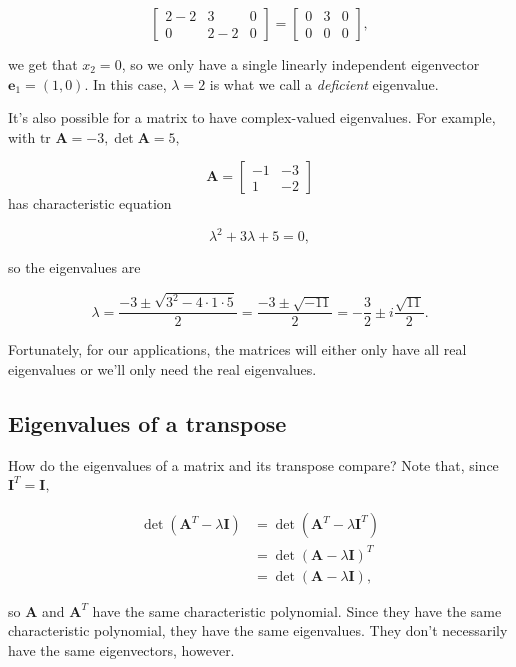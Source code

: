 \documentclass[
]{book}
\theoremstyle{definition}
\theoremstyle{definition}
\theoremstyle{definition}
\theoremstyle{definition}
\theoremstyle{remark}
\begin{document}
\[\left[\begin{array}{cc|c}2-2 & 3 & 0\\0 & 2-2 & 0\end{array}\right]=\left[\begin{array}{cc|c}0 & 3& 0\\0 & 0 & 0\end{array}\right],\]

we get that \(x_2=0\), so we only have a single linearly independent eigenvector \(\mathbf{e}_1=(1,0)\). In this case, \(\lambda=2\) is what we call a \emph{deficient} eigenvalue.

It's also possible for a matrix to have complex-valued eigenvalues. For example, with \(\text{tr }\mathbf{A}=-3,\det \mathbf{A}=5,\)

\[\mathbf{A}=\begin{bmatrix} -1 & -3\\1 & -2\end{bmatrix}\]
has characteristic equation

\[\lambda^2+3\lambda+5=0,\]

so the eigenvalues are

\[\lambda=\frac{-3\pm \sqrt{3^2-4\cdot 1\cdot 5}}{2}=\frac{-3\pm \sqrt{-11}}{2}=-\frac{3}{2}\pm i\frac{\sqrt{11}}{2}.\]

Fortunately, for our applications, the matrices will either only have all real eigenvalues or we'll only need the real eigenvalues.

\subsection*{Eigenvalues of a transpose}\label{eigenvalues-of-a-transpose}

How do the eigenvalues of a matrix and its transpose compare? Note that, since \(\mathbf{I}^T=\mathbf{I},\)

\begin{align*}
\det (\mathbf{A}^T-\lambda \mathbf{I})&=\det (\mathbf{A}^T-\lambda \mathbf{I}^T)\\
&=\det (\mathbf{A}-\lambda \mathbf{I})^T\\
&=\det (\mathbf{A}-\lambda \mathbf{I}),
\end{align*}

so \(\mathbf{A}\) and \(\mathbf{A}^T\) have the same characteristic polynomial. Since they have the same characteristic polynomial, they have the same eigenvalues. They don't necessarily have the same eigenvectors, however.
\end{document}
